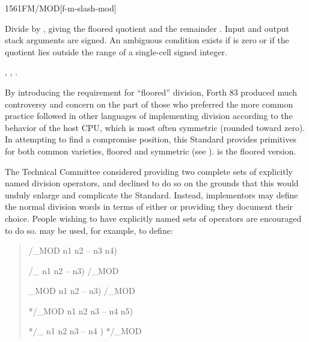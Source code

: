 \begin{worddef}{1561}{FM/MOD}[f-m-slash-mod]
\item {}

	Divide  by , giving the floored quotient
	 and the remainder . Input and output stack
	arguments are signed. An ambiguous condition exists if
	 is zero or if the quotient lies outside the range of
	a single-cell signed integer.

\see {},
	,
	.

	\begin{defer}
	\rationale %
		By introducing the requirement for ``floored'' division,
		Forth 83 produced much controversy and concern on the part of
		those who preferred the more common practice followed in other
		languages of implementing division according to the behavior
		of the host CPU, which is most often symmetric (rounded toward
		zero). In attempting to find a compromise position, this
		Standard provides primitives for both common varieties, floored
		and symmetric (see ).  is the floored
		version.

		The Technical Committee considered providing two complete sets
		of explicitly named division operators, and declined to do so
		on the grounds that this would unduly enlarge and complicate
		the Standard. Instead, implementors may define the normal
		division words in terms of either  or
		 providing they document their choice. People
		wishing to have explicitly named sets of operators are
		encouraged to do so.  may be used, for example,
		to define:

		\begin{quote}\ttfamily
			\word{:} /\_MOD  n1 n2 -- n3 n4)
				   
			\word{;}

			\word{:} /\_  n1 n2 -- n3)
				/\_MOD  
			\word{;}

			\word{:} \_MOD  n1 n2 -- n3)
				/\_MOD 
			\word{;}

			\word{:} */\_MOD  n1 n2 n3 -- n4 n5)
				   
			\word{;}

			\word{:} */\_  n1 n2 n3 -- n4 )
				*/\_MOD  
			\word{;}
		\end{quote}


\end{defer}
\end{worddef}
